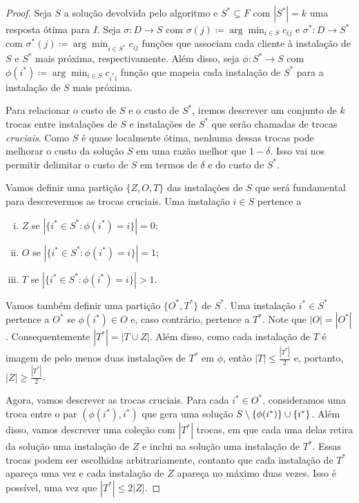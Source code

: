 \begin{proof}
Seja $S$ a solução devolvida pelo algoritmo e $S^* \subseteq F$ com $|S^*| = k$ uma resposta ótima para $I$. Seja ${\sigma : D \rightarrow S}$ com ${\sigma(j) \coloneqq \arg\min_{i \in S} c_{ij}}$ e ${\sigma^* : D \rightarrow S^*}$ com ${\sigma^*(j) \coloneqq \arg\min_{i\in S^*} c_{ij}}$ funções que associam cada cliente à instalação de $S$ e $S^*$ mais próxima, respectivamente.
Além disso, seja $\phi:S^* \rightarrow S$ com $\phi(i^*) \coloneqq \arg\min_{i \in S} c_{i^*i}$ função que mapeia cada instalação de $S^*$ para a instalação de $S$ mais próxima.

Para relacionar o custo de $S$ e o custo de $S^*$, iremos descrever um conjunto de $k$ trocas entre instalações de $S$ e instalações de $S^*$ que serão chamadas de trocas \emph{cruciais}. Como $S$ é quase localmente ótima, nenhuma dessas trocas pode melhorar o custo da solução $S$ em uma razão melhor que $ 1-\delta$. Isso vai nos permitir delimitar o custo de $S$ em termos de $\delta$ e do custo de $S^*$.

Vamos definir uma partição $\{Z,O,T\}$ das instalações de $S$ que será fundamental para descrevermos as trocas cruciais. Uma instalação $i \in S$ pertence a 
\begin{enumerate}[i.]
\item $Z$ se $|\{i^* \in S^* : \phi(i^*) = i\}| = 0$;
\item $O$ se $|\{i^* \in S^* : \phi(i^*) = i\}| = 1$;
\item $T$ se $|\{i^* \in S^* : \phi(i^*) = i\}| > 1$.
\end{enumerate}
Vamos também definir uma partição $\{O^*,T^*\}$ de $S^*$. Uma instalação $i^* \in S^*$ pertence a $O^*$ se $\phi(i^*) \in O$ e, caso contrário, pertence a $T^*$. Note que $|O| = |O^*|$. Consequentemente $|T^*| = |T\cup Z|$. Além disso, como cada instalação de $T$ é imagem de pelo menos duas instalações de $T^*$ em $\phi$, então $|T| \leq \frac{|T^*|}{2}$ e, portanto, $|Z| \geq \frac{|T^*|}{2}$.

Agora, vamos descrever as trocas cruciais. Para cada $i^* \in O^*$, consideramos uma troca entre o par $(\phi(i^*),i^*)$ que gera uma solução $S\setminus \{\phi(i^*)\} \cup \{i^*\}$. Além disso, vamos descrever uma coleção com $|T^*|$ trocas, em que cada uma delas retira da solução uma instalação de $Z$ e inclui na solução uma instalação de $T^*$. Essas trocas podem ser escolhidas arbitrariamente, contanto que cada instalação de $T^*$ apareça uma vez e cada instalação de $Z$ apareça no máximo duas vezes. Isso é possível, uma vez que $|T^*| \leq 2 |Z|$.


\end{proof}
